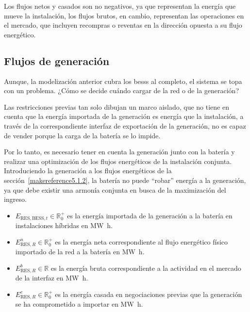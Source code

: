 Los flujos netos y casados son no negativos, ya que representan la energía que mueve la instalación, los flujos brutos, en cambio, representan las operaciones en el mercado, que incluyen recompras o reventas en la dirección opuesta a su flujo energético.

\subsection{Flujos de generación}%
\label{makereference5.1.3}

Aunque, la modelización anterior cubra los \glspl{bess} al completo, el sistema se topa con un problema. ¿Cómo se decide cuándo cargar de la red o de la generación?

Las restricciones previas tan solo dibujan un marco aislado, que no tiene en cuenta que la energía importada de la generación es energía que la instalación, a través de la correspondiente interfaz de exportación de la generación, no es capaz de vender porque la carga de la batería se lo impide.

Por lo tanto, es necesario tener en cuenta la generación junto con la batería y realizar una optimización de los flujos energéticos de la instalación conjunta. Introduciendo la generación a los flujos energéticos de la sección~\ref{makereference5.1.2}, la batería no puede ``robar'' energía a la generación, ya que debe existir una armonía conjunta en busca de la maximización del ingreso.

\begin{itemize}

  \item \( E_{\text{RES}, \text{BESS}, t} \in \mathbb{R}^{+}_{0} \) es la energía importada de la generación a la batería en instalaciones híbridas en \si{{\mega\watt\hour}}.

  \item \( E^{n}_{\text{RES}, R} \in \mathbb{R}^{+}_{0} \) es la energía neta correspondiente al flujo energético físico importado de la red a la batería en \si{{\mega\watt\hour}}.

  \item \( E^{b}_{\text{RES}, R} \in \mathbb{R} \) es la energía bruta correspondiente a la actividad en el mercado de la interfaz en \si{{\mega\watt\hour}}.

  \item \( E^{c}_{\text{RES}, R} \in \mathbb{R}^{+}_{0} \) es la energía casada en negociaciones previas que la generación se ha comprometido a importar en \si{{\mega\watt\hour}}.

\end{itemize}

